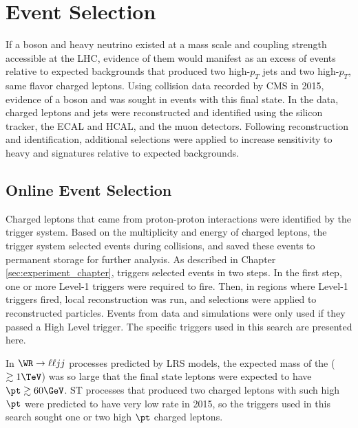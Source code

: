 \chapter{Event Selection}
\label{sec:event_selection_chapter}

If a \WR boson and heavy neutrino \nul existed at a mass scale and coupling strength accessible 
at the LHC, evidence of them would manifest as an excess of events relative to expected backgrounds 
that produced two high-$p_{T}$ jets and two high-$p_{T}$, same flavor charged leptons.  
Using collision data recorded by CMS in 2015, evidence of a \WR boson and \nul was sought in events 
with this final state.  In the data, charged leptons and jets were reconstructed and identified 
using the silicon tracker, the ECAL and HCAL, and the muon detectors.  Following reconstruction 
and identification, additional selections were applied to increase sensitivity to heavy \WR and 
\nul signatures relative to expected backgrounds.

\section{Online Event Selection}
\label{sec:triggers}
Charged leptons that came from proton-proton interactions were identified by the trigger system.  Based 
on the multiplicity and energy of charged leptons, the trigger system selected events during 
collisions, and saved these events to permanent storage for further analysis.  As described in Chapter 
\ref{sec:experiment_chapter}, triggers selected events in two steps.  In the first step, one or more Level-1 triggers were 
required to fire.  Then, in regions where Level-1 triggers fired, local reconstruction was run, and 
selections were applied to reconstructed particles.  Events from data and simulations were only 
used if they passed a High Level trigger.  The specific triggers used in this search are presented 
here.

In $\WR \rightarrow \ell\ell jj$ processes predicted by LRS models, the expected mass of the \WR ($\gtrsim 1 \TeV$) was 
so large that the final state leptons were expected to have $\pt \gtrsim 60 \GeV$.  ST processes that 
produced two charged leptons with such high $\pt$ were predicted to have very low rate in 2015, so the 
triggers used in this search sought one or two high $\pt$ charged leptons.

